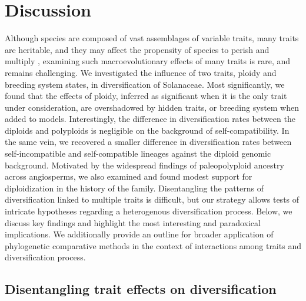 \section{Discussion}

%
Although species are composed of vast assemblages of variable traits, many traits are heritable, and they may affect the propensity of species to perish and multiply \citep{lewontin_1970}, examining such macroevolutionary effects of many traits is rare, and remains challenging.
We investigated the influence of two traits, ploidy and breeding system states, in diversification of Solanaceae.
Most significantly, we found that the effects of ploidy, inferred as significant when it is the only trait under consideration, are overshadowed by hidden traits, or breeding system when added to models.  %
Interestingly, the difference in diversification rates between the diploids and polyploids is negligible on the background of self-compatibility.
In the same vein, we recovered a smaller difference in diversification rates between self-incompatible and self-compatible lineages against the diploid genomic background.
Motivated by the widespread findings of paleopolyploid ancestry across angiosperms, we also examined and found modest support for diploidization in the history of the family. %
Disentangling the patterns of diversification linked to multiple traits is difficult, but our strategy allows tests of intricate hypotheses regarding a heterogenous diversification process.
Below, we discuss key findings and highlight the most interesting and paradoxical implications.
We additionally provide an outline for broader application of phylogenetic comparative methods in the context of interactions among traits and diversification process.

\subsection*{Disentangling trait effects on diversification} %

